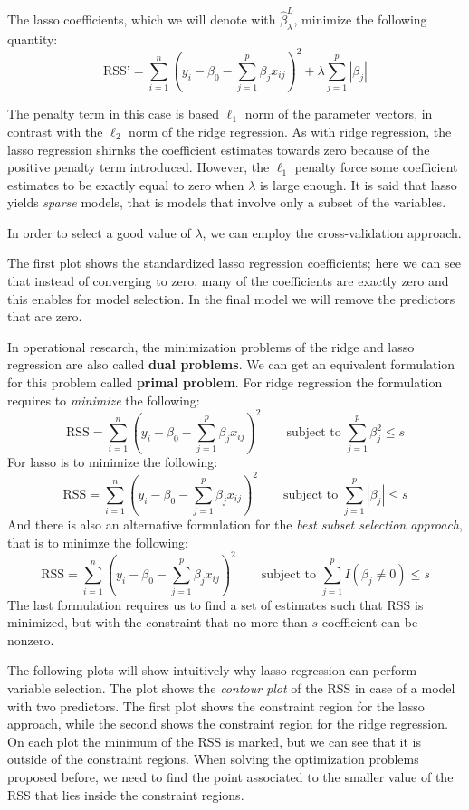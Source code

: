 The lasso coefficients, which we will denote with $\hat{\beta}_\lambda^L$, minimize the following quantity:
\[
    \text{RSS'} = \sum_{i=1}^{n} \left(y_i - \beta_0 - \sum_{j=1}^{p} \beta_j x_{ij}\right)^2 + \lambda \sum_{j=1}^{p} |\beta_j |
\]

The penalty term in this case is based $\ell_1$ norm of the parameter vectors, in contrast with the $\ell_2$ norm of the ridge regression. As with ridge regression, the lasso regression shirnks the coefficient estimates towards zero because of the positive penalty term introduced. However, the $\ell_1$ penalty force some coefficient estimates to be exactly equal to zero when $\lambda$ is large enough. It is said that lasso yields \textit{sparse} models, that is models that involve only a subset of the variables.

In order to select a good value of $\lambda$, we can employ the cross-validation approach.

The first plot shows the standardized lasso regression coefficients; here we can see that instead of converging to zero, many of the coefficients are exactly zero and this enables for model selection. In the final model we will remove the predictors that are zero.

In operational research, the minimization problems of the ridge and lasso regression are also called \textbf{dual problems}. We can get an equivalent formulation for this problem called \textbf{primal problem}. For ridge regression the formulation requires to \textit{minimize} the following:
\[
    \text{RSS} = \sum_{i=1}^{n} \left(y_i - \beta_0 - \sum_{j=1}^{p} \beta_j x_{ij}\right)^2 \qquad \text{subject to } \sum_{j=1}^p \beta_j^2 \leq s
\]
For lasso is to minimize the following:
\[
    \text{RSS} = \sum_{i=1}^{n} \left(y_i - \beta_0 - \sum_{j=1}^{p} \beta_j x_{ij}\right)^2 \qquad \text{subject to } \sum_{j=1}^p |\beta_j| \leq s
\]
And there is also an alternative formulation for the \textit{best subset selection approach}, that is to minimze the following:
\[
    \text{RSS} = \sum_{i=1}^{n} \left(y_i - \beta_0 - \sum_{j=1}^{p} \beta_j x_{ij}\right)^2 \qquad \text{subject to } \sum_{j=1}^p I(\beta_j \neq 0) \leq s
\]
The last formulation requires us to find a set of estimates such that RSS is minimized, but with the constraint that no more than $s$ coefficient can be nonzero.

The following plots will show intuitively why lasso regression can perform variable selection. The plot shows the \textit{contour plot} of the RSS in case of a model with two predictors. The first plot shows the constraint region for the lasso approach, while the second shows the constraint region for the ridge regression. On each plot the minimum of the RSS is marked, but we can see that it is outside of the constraint regions. When solving the optimization problems proposed before, we need to find the point associated to the smaller value of the RSS that lies inside the constraint regions.

